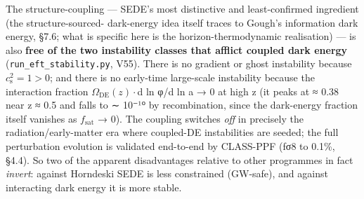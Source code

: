 \documentclass[
  10pt,
]{article}
\begin{document}
The structure-coupling --- SEDE's most distinctive and least-confirmed
ingredient (the structure-sourced- dark-energy idea itself traces to
Gough's information dark energy, §7.6; what is specific here is the
horizon-thermodynamic realisation) --- is also \textbf{free of the two
instability classes that afflict coupled dark energy}
(\texttt{run\_eft\_stability.py}, V55). There is no gradient or ghost
instability because \(c_{\mathrm{s}}^{2} = 1 > 0\); and there is no
early-time large-scale instability because the interaction fraction
\(\Omega _{\mathrm{DE}}(z)\cdot\)\textbar d ln φ/d ln a\textbar{} → 0 at
high z (it peaks at ≈ 0.38 near z ≈ 0.5 and falls to ∼ 10⁻¹⁰ by
recombination, since the dark-energy fraction itself vanishes as
\(f_{\mathrm{sat}}\) → 0). The coupling switches \emph{off} in precisely
the radiation/early-matter era where coupled-DE instabilities are
seeded; the full perturbation evolution is validated end-to-end by
CLASS-PPF (fσ8 to 0.1\%, §4.4). So two of the apparent disadvantages
relative to other programmes in fact \emph{invert}: against Horndeski
SEDE is less constrained (GW-safe), and against interacting dark energy
it is more stable.
\end{document}
